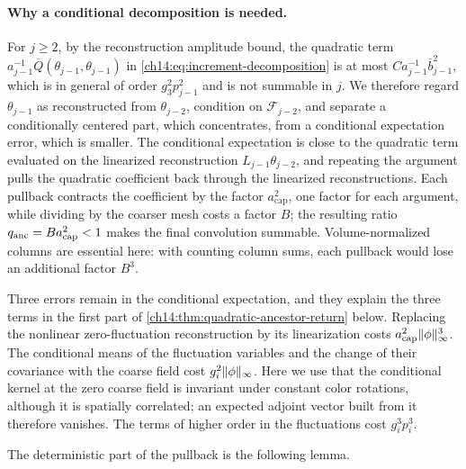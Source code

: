 \paragraph{Why a conditional decomposition is needed.}
For $j\ge2$, by the reconstruction amplitude bound, the quadratic term $a_{j-1}^{-1}\overline Q(\theta_{j-1},\theta_{j-1})$ in \eqref{ch14:eq:increment-decomposition} is at most $Ca_{j-1}^{-1}\overline b_{j-1}^2$, which is in general of order $g_3^2p_{j-1}^2$ and is not summable in $j$. We therefore regard $\theta_{j-1}$ as reconstructed from $\theta_{j-2}$, condition on $\mathcal F_{j-2}$, and separate a conditionally centered part, which concentrates, from a conditional expectation error, which is smaller. The conditional expectation is close to the quadratic term evaluated on the linearized reconstruction $L_{j-1}\theta_{j-2}$, and repeating the argument pulls the quadratic coefficient back through the linearized reconstructions. Each pullback contracts the coefficient by the factor $a_{\mathrm{cap}}^2$, one factor for each argument, while dividing by the coarser mesh costs a factor $B$; the resulting ratio $q_{\mathrm{anc}}=Ba_{\mathrm{cap}}^2<1$ makes the final convolution summable. Volume-normalized columns are essential here: with counting column sums, each pullback would lose an additional factor $B^3$.

Three errors remain in the conditional expectation, and they explain the three terms in the first part of \cref{ch14:thm:quadratic-ancestor-return} below. Replacing the nonlinear zero-fluctuation reconstruction by its linearization costs $a_{\mathrm{cap}}^2\lVert \phi\rVert_\infty^3$. The conditional means of the fluctuation variables and the change of their covariance with the coarse field cost $g_i^2\lVert \phi\rVert_\infty$. Here we use that the conditional kernel at the zero coarse field is invariant under constant color rotations, although it is spatially correlated; an expected adjoint vector built from it therefore vanishes. The terms of higher order in the fluctuations cost $g_i^3p_i^3$.

The deterministic part of the pullback is the following lemma.

